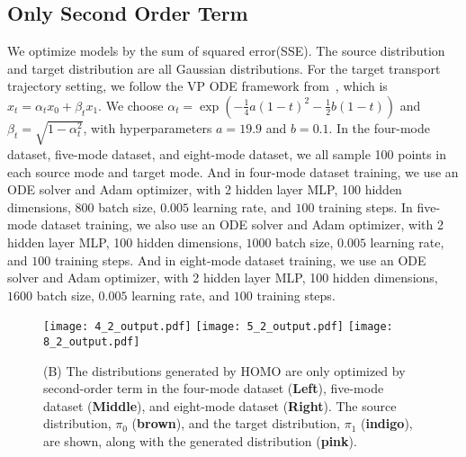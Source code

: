 \subsection{Only Second Order Term}\label{sec:app:second_order}
We optimize models by the sum of squared error(SSE). The source distribution and target distribution are all Gaussian distributions. For the target transport trajectory setting, we follow the VP ODE framework from~\cite{rectified_flow}, which is $x_t = \alpha_t x_0 + \beta_t x_1$. We choose $\alpha_t = \exp(-\frac{1}{4} a(1-t)^2 - \frac{1}{2} b(1-t))$ and $\beta_t = \sqrt{1 - \alpha_t^2}$, with hyperparameters $a = 19.9$ and $b = 0.1$. In the four-mode dataset, five-mode dataset, and eight-mode dataset, we all sample 100 points in each source mode and target mode. And in four-mode dataset training, we use an ODE solver and Adam optimizer, with 2 hidden layer MLP, 100 hidden dimensions, $800$ batch size, $0.005$ learning rate, and $100$ training steps. In five-mode dataset training, we also use an ODE solver and Adam optimizer, with 2 hidden layer MLP, 100 hidden dimensions, $1000$ batch size, $0.005$ learning rate, and $100$ training steps. And in eight-mode dataset training, we use an ODE solver and Adam optimizer, with 2 hidden layer MLP, 100 hidden dimensions, $1600$ batch size, $0.005$ learning rate, and $100$ training steps. 


\begin{figure}[!ht]
\centering
\texttt{[image: 4\_2\_output.pdf]}
\texttt{[image: 5\_2\_output.pdf]}
\texttt{[image: 8\_2\_output.pdf]}
\caption{
(B) The distributions generated by HOMO are only optimized by second-order term in the four-mode dataset (\textbf{Left}), five-mode dataset (\textbf{Middle}), and eight-mode dataset (\textbf{Right}). 
The source distribution, $\pi_0$ ({\textbf{brown}}), and the target distribution, $\pi_1$ ({\textbf{indigo}}), are shown, along with the generated distribution ({\textbf{pink}}). 
}
\label{fig:2_distribution}
\end{figure}

